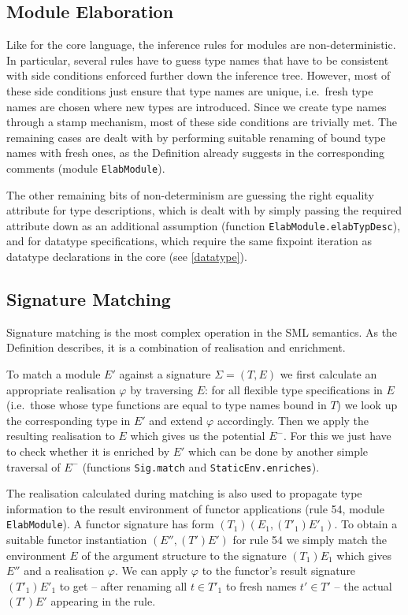 \documentclass[twoside,titlepage]{article}
\begin{document}
\subsection{Module Elaboration}
\label{moduleelaboration}

Like for the core language, the inference rules for modules are non-deterministic. In particular, several rules have to guess type names that have to be consistent with side conditions enforced further down the inference tree. However, most of these side conditions just ensure that type names are unique, i.e.\ fresh type names are chosen where new types are introduced. Since we create type names through a stamp mechanism, most of these side conditions are trivially met. The remaining cases are dealt with by performing suitable renaming of bound type names with fresh ones, as the Definition already suggests in the corresponding comments (module {\tt ElabModule}).

The other remaining bits of non-determinism are guessing the right equality attribute for type descriptions, which is dealt with by simply passing the required attribute down as an additional assumption (function {\tt ElabModule.elabTypDesc}), and for datatype specifications, which require the same fixpoint iteration as datatype declarations in the core (see \ref{datatype}).


\subsection{Signature Matching}
\label{matching}

Signature matching is the most complex operation in the SML semantics. As the Definition describes, it is a combination of realisation and enrichment.

To match a module $E'$ against a signature $\Sigma = (T,E)$ we first calculate an appropriate realisation $\varphi$ by traversing $E$: for all flexible type specifications in $E$ (i.e.\ those whose type functions are equal to type names bound in $T$) we look up the corresponding type in $E'$ and extend $\varphi$ accordingly. Then we apply the resulting realisation to $E$ which gives us the potential $E^-$. For this we just have to check whether it is enriched by $E'$ which can be done by another simple traversal of $E^-$ (functions {\tt Sig.match} and {\tt StaticEnv.enriches}).

The realisation calculated during matching is also used to propagate type information to the result environment of functor applications (rule 54, module {\tt ElabModule}). A functor signature has form $(T_1)(E_1,(T'_1)E'_1)$. To obtain a suitable functor instantiation $(E'',(T')E')$ for rule 54 we simply match the environment $E$ of the argument structure to the signature $(T_1)E_1$ which gives $E''$ and a realisation $\varphi$. We can apply $\varphi$ to the functor's result signature $(T'_1)E'_1$ to get -- after renaming all $t \in T'_1$ to fresh names $t' \in T'$ -- the actual $(T')E'$ appearing in the rule.
\end{document}
